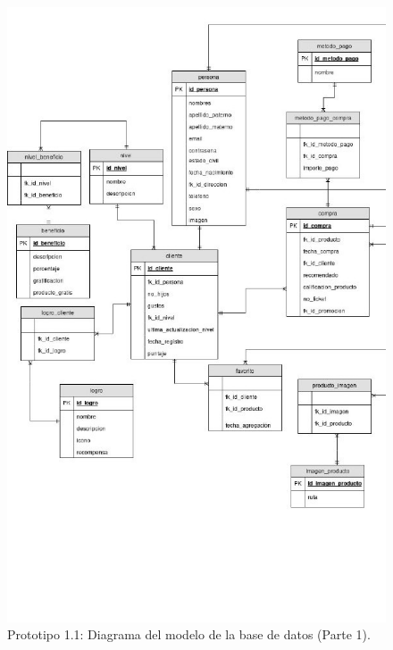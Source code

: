 \FloatBarrier
\begin{figure}[htbp!]
		\centering
			\includegraphics[width=.8 \textwidth]{imagenes/modeloDatos/TT_database1_1_parte1}
		\caption{Prototipo 1.1: Diagrama del modelo de la base de datos (Parte 1).}
		\label{image:prototipo11basededatos2}
\end{figure}
\FloatBarrier

